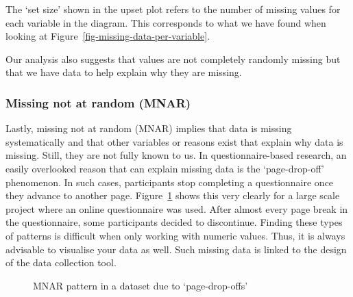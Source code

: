 \documentclass[
  letterpaper,
]{krantz}
\begin{document}
The `set size' shown in the upset plot refers to the number of missing
values for each variable in the diagram. This corresponds to what we
have found when looking at Figure~\ref{fig-missing-data-per-variable}.

Our analysis also suggests that values are not completely randomly
missing but that we have data to help explain why they are missing.

\subsubsection{Missing not at random
(MNAR)}\label{sec-missing-not-at-random-mnar}

Lastly, missing not at random (MNAR) implies that data is missing
systematically and that other variables or reasons exist that explain
why data is missing. Still, they are not fully known to us. In
questionnaire-based research, an easily overlooked reason that can
explain missing data is the `page-drop-off' phenomenon. In such cases,
participants stop completing a questionnaire once they advance to
another page. Figure~\ref{fig-mnar-example} shows this very clearly for
a large scale project where an online questionnaire was used. After
almost every page break in the questionnaire, some participants decided
to discontinue. Finding these types of patterns is difficult when only
working with numeric values. Thus, it is always advisable to visualise
your data as well. Such missing data is linked to the design of the data
collection tool.

\begin{figure}


\caption{\label{fig-mnar-example}MNAR pattern in a dataset due to
`page-drop-offs'}

\end{figure}%
\end{document}
